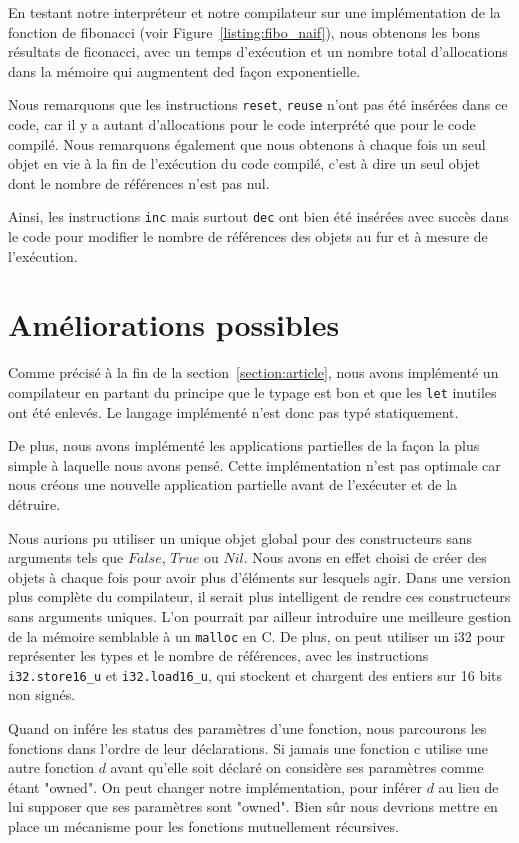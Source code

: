 \documentclass{rapportECL}
\begin{document}
En testant notre interpréteur et notre compilateur sur une implémentation de la fonction de fibonacci (voir Figure~\ref{listing:fibo_naif}), nous obtenons les bons résultats de ficonacci, avec un temps d'exécution et un nombre total d'allocations dans la mémoire qui augmentent ded façon exponentielle.

Nous remarquons que les instructions \verb|reset|, \verb|reuse| n'ont pas été insérées dans ce code, car il y a autant d'allocations pour le code interprété que pour le code compilé. Nous remarquons également que nous obtenons à chaque fois un seul objet en vie à la fin de l'exécution du code compilé, c'est à dire un seul objet dont le nombre de références n'est pas nul. 

Ainsi, les instructions \verb|inc| mais surtout \verb|dec| ont bien été insérées avec succès dans le code pour modifier le nombre de références des objets au fur et à mesure de l'exécution.

\section{Améliorations possibles}

Comme précisé à la fin de la section~\ref{section:article}, nous avons implémenté un compilateur en partant du principe que le 
typage est bon et que les \verb|let| inutiles ont été enlevés. Le langage implémenté n'est donc pas typé statiquement.

De plus, nous avons implémenté les applications partielles de la façon la plus simple à laquelle nous avons pensé. 
Cette implémentation n'est pas optimale car nous créons une nouvelle application partielle avant de l'exécuter et de la détruire.

Nous aurions pu utiliser un unique objet global pour des constructeurs sans arguments tels que $False$, $True$ ou $Nil$. 
Nous avons en effet choisi de créer des objets à chaque fois pour avoir plus d'éléments sur lesquels agir. Dans une 
version plus complète du compilateur, il serait plus intelligent de rendre ces constructeurs sans arguments uniques. L'on 
pourrait par ailleur introduire une meilleure gestion de la mémoire semblable à un \verb|malloc| en C. De plus, on peut 
utiliser un i32 pour représenter les types et le nombre de références, avec les instructions \verb|i32.store16_u| et \verb|i32.load16_u|, qui stockent et chargent des entiers sur 16 bits non signés.

Quand on infére les status des paramètres d'une fonction, nous parcourons les fonctions dans l'ordre de leur déclarations. 
Si jamais une fonction c utilise une autre fonction $d$ avant qu'elle soit déclaré on considère ses paramètres comme étant "owned".
On peut changer notre implémentation, pour inférer $d$ au lieu de lui supposer que ses paramètres sont "owned".
Bien sûr nous devrions mettre en place un mécanisme pour les fonctions mutuellement récursives.


\newpage

\printbibliography
\end{document}
